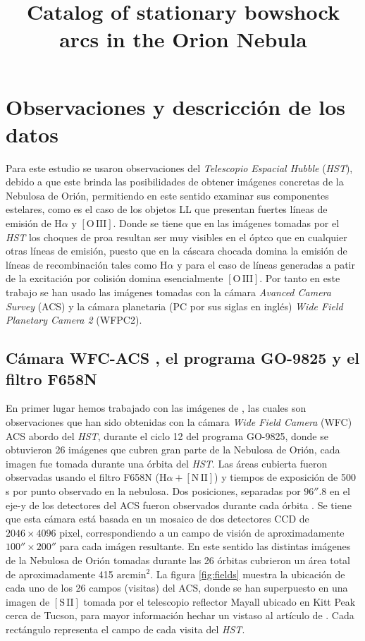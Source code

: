 \documentclass{article}
\title{Catalog of stationary bowshock arcs in the Orion Nebula}
\newcommand\ha{\ensuremath{\mathrm{H}\alpha}}
\newcommand\nii{\ensuremath{\mathrm{[N\,II]}}}
\newcommand\oiii{\ensuremath{\mathrm{[O\,III]}}}
\newcommand\sii{\ensuremath{\mathrm{[S\,II]}}}
\begin{document}
\maketitle

\section{Observaciones y descricción de los datos }
\label{sec:datos}


Para este estudio se usaron observaciones del \textit{Telescopio Espacial Hubble} (\textit{HST}), debido a que este brinda las posibilidades de obtener imágenes concretas de la Nebulosa de Orión, permitiendo en este sentido examinar sus componentes estelares, como es el caso de los objetos LL que presentan fuertes líneas de emisión de \ha{} y \oiii{}. Donde se tiene que en las imágenes tomadas por el \textit{HST} los choques de proa resultan ser muy visibles en el óptco que en cualquier otras líneas de emisión, puesto que en la cáscara chocada domina la emisión de líneas de recombinación tales como \ha{} y para el caso de líneas generadas a patir de la excitación por colisión domina esencialmente \oiii{}. Por tanto en este trabajo se han usado las imágenes tomadas con la cámara \textit{Avanced Camera Survey} (ACS) y la cámara planetaria (PC por sus siglas en inglés) \textit{Wide Field Planetary Camera 2} (WFPC2). 

\subsection{Cámara  WFC-ACS , el programa GO-9825 y el filtro F658N }
\label{sec:acs}

En primer lugar  hemos trabajado con las imágenes de \citet{Bally:2006a}, las cuales son observaciones que han sido obtenidas con la cámara \textit{Wide Field Camera} (WFC) ACS abordo del \textit{HST}, durante el ciclo 12 del programa GO-9825, donde se obtuvieron 26 imágenes que cubren gran parte de la Nebulosa de Orión, cada imagen fue tomada durante una órbita del \textit{HST}. Las áreas cubierta fueron observadas usando el filtro F658N (\(\ha+\nii\)) y tiempos de exposición de 500 s por punto observado en la nebulosa. Dos posiciones, separadas por \(96''.8\) en el eje-y de los detectores del ACS fueron observados durante cada órbita \citep{Bally:2006a}. Se tiene que esta cámara está basada en un mosaico de dos detectores CCD de \(2046 \times 4096\) pixel, correspondiendo a un campo de visión de aproximadamente \(100'' \times 200'' \) para cada imágen resultante. En este sentido las distintas imágenes de la Nebulosa de Orión tomadas durante las 26 órbitas cubrieron un área total de aproximadamente 415 \(\text{arcmin}^{2}\). La figura \ref{fig:fields} muestra la ubicación de cada uno de los 26 campos (visitas) del ACS, donde se han superpuesto en una imagen de \sii{} tomada por el telescopio reflector Mayall ubicado en Kitt Peak cerca de Tucson, para mayor información hechar un vistaso al artículo de \citet{Bally:2001a}. Cada rectángulo representa el campo de cada visita del \textit{HST}.\\
\end{document}
